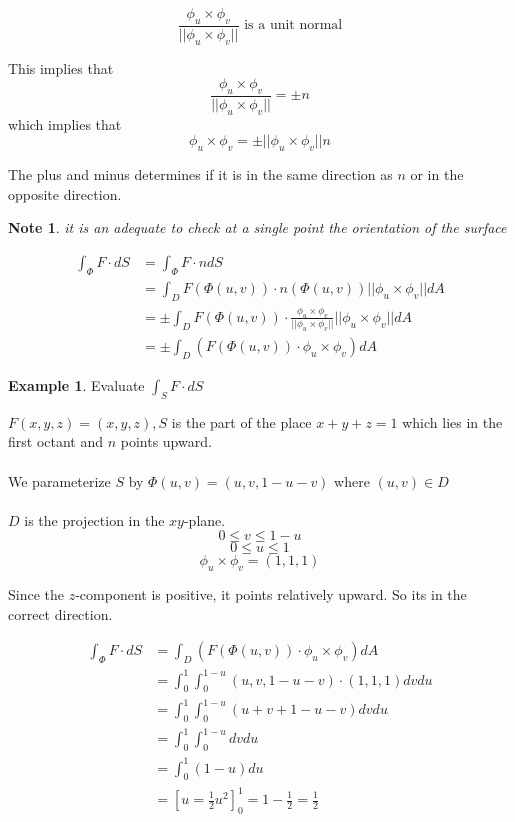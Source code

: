 \documentclass[12pt]{article}
\theoremstyle{plain}
\newtheorem*{note}{Note}
\theoremstyle{definition}
\newtheorem{example}[theorem]{Example}
\begin{document}
$$\frac{\phi_u \times \phi_v}{||\phi_u \times \phi_v||} \text{ is a unit normal}$$

This implies that
$$\frac{\phi_u \times \phi_v}{||\phi_u \times \phi_v||} = \pm n$$
which implies that
$$\phi_u \times \phi_v = \pm || \phi_u \times \phi_v|| n$$

The plus and minus determines if it is in the same direction as $n$ or in the opposite direction.

\begin{note}
	it is an adequate to check at a single point the orientation of the surface
\end{note}


\begin{align*}
	\int_\Phi F \cdot dS &= \int_\Phi F \cdot n dS\\
	&= \int_D F (\Phi (u,v)) \cdot n (\Phi(u,v)) || \phi_u \times \phi_v|| dA\\
	&= \pm \int_D F (\Phi (u,v)) \cdot \frac{\phi_u \times \phi_v}{||\phi_u \times \phi_v||} ||\phi_u \times \phi_v|| dA\\
	&= \pm \int_D (F(\Phi (u,v)) \cdot \phi_u \times \phi_v) dA
\end{align*}

\begin{example}
	Evaluate $\int_S F \cdot dS$

	$F(x,y,z) = (x,y,z), S$ is the part of the place $x+y+z=1$ which lies in the first octant and $n$ points upward.\\
	\\
	We parameterize $S$ by $\Phi (u,v) = (u,v, 1-u-v)$ where $(u,v)\in D$\\
	\\
	$D$ is the projection in the $xy$-plane.
	$$0 \leq v \leq 1-u$$
	$$0 \leq u \leq 1$$
	$$\phi_u \times \phi_v = (1,1,1)$$

	Since the $z$-component is positive, it points relatively upward. So its in the correct direction.

	\begin{align*}
		\int_\Phi F \cdot dS &= \int_D (F(\Phi (u,v)) \cdot \phi_u \times \phi_v) dA\\
		&= \int_0^1 \int_0^{1-u} (u,v,1-u-v) \cdot (1,1,1) dv du\\
		&= \int_0^1 \int_0^{1-u} (u+v+1-u-v) dv du\\
		&=\int_0^1 \int_0^{1-u} dv du\\
		&= \int_0^1 (1-u) du\\
		&= [u=\frac{1}{2}u^2]_0^1 = 1 - \frac{1}{2} = \frac{1}{2}
	\end{align*}



\end{example}
\end{document}
